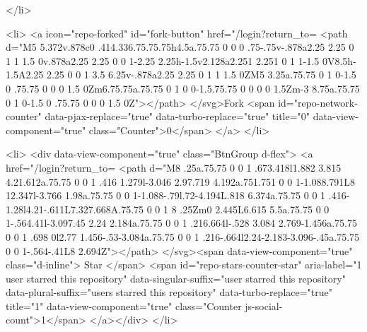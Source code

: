   </li>

  <li>
          <a icon="repo-forked" id="fork-button" href="/login?return_to=%
    <path d="M5 5.372v.878c0 .414.336.75.75.75h4.5a.75.75 0 0 0 .75-.75v-.878a2.25 2.25 0 1 1 1.5 0v.878a2.25 2.25 0 0 1-2.25 2.25h-1.5v2.128a2.251 2.251 0 1 1-1.5 0V8.5h-1.5A2.25 2.25 0 0 1 3.5 6.25v-.878a2.25 2.25 0 1 1 1.5 0ZM5 3.25a.75.75 0 1 0-1.5 0 .75.75 0 0 0 1.5 0Zm6.75.75a.75.75 0 1 0 0-1.5.75.75 0 0 0 0 1.5Zm-3 8.75a.75.75 0 1 0-1.5 0 .75.75 0 0 0 1.5 0Z"></path>
</svg>Fork
    <span id="repo-network-counter" data-pjax-replace="true" data-turbo-replace="true" title="0" data-view-component="true" class="Counter">0</span>
</a>
  </li>

  <li>
        <div data-view-component="true" class="BtnGroup d-flex">
        <a href="/login?return_to=%
    <path d="M8 .25a.75.75 0 0 1 .673.418l1.882 3.815 4.21.612a.75.75 0 0 1 .416 1.279l-3.046 2.97.719 4.192a.751.751 0 0 1-1.088.791L8 12.347l-3.766 1.98a.75.75 0 0 1-1.088-.79l.72-4.194L.818 6.374a.75.75 0 0 1 .416-1.28l4.21-.611L7.327.668A.75.75 0 0 1 8 .25Zm0 2.445L6.615 5.5a.75.75 0 0 1-.564.41l-3.097.45 2.24 2.184a.75.75 0 0 1 .216.664l-.528 3.084 2.769-1.456a.75.75 0 0 1 .698 0l2.77 1.456-.53-3.084a.75.75 0 0 1 .216-.664l2.24-2.183-3.096-.45a.75.75 0 0 1-.564-.41L8 2.694Z"></path>
</svg><span data-view-component="true" class="d-inline">
          Star
</span>          <span id="repo-stars-counter-star" aria-label="1 user starred this repository" data-singular-suffix="user starred this repository" data-plural-suffix="users starred this repository" data-turbo-replace="true" title="1" data-view-component="true" class="Counter js-social-count">1</span>
</a></div>
  </li>

